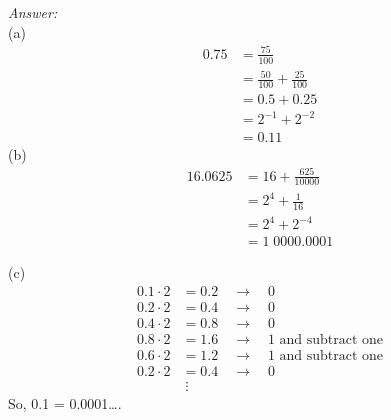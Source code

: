 \documentclass[11pt]{article}
\newcommand{\answer}{{\color{red}\textit{Answer: }}}
\begin{document}
\answer \\
(a)
\begin{align*}
    0.75 &= \frac{75}{100}\\
         &= \frac{50}{100} + \frac{25}{100}\\
         &= 0.5 + 0.25 \\
         &= 2^{-1} + 2^{-2}\\
         &= 0.11
\end{align*}
(b)
\begin{align*}
    16.0625 &= 16 + \frac{625}{10000}\\
            &= 2^4 + \frac{1}{16}\\
            &= 2^4 + 2^{-4} \\
            &= 1\;0000.0001
\end{align*}

(c)
\begin{align*}
    0.1 \cdot 2 &= 0.2 \quad\rightarrow\quad 0\\
    0.2 \cdot 2 &= 0.4 \quad\rightarrow\quad 0\\
	0.4 \cdot 2 &= 0.8 \quad\rightarrow\quad 0\\
	0.8 \cdot 2 &= 1.6 \quad\rightarrow\quad 1 \text{ and subtract one}\\
	0.6 \cdot 2 &= 1.2 \quad\rightarrow\quad 1 \text{ and subtract one}\\
	0.2 \cdot 2 &= 0.4 \quad\rightarrow\quad 0\\
    &\;\vdots
\end{align*}
So, 0.1 = 0.0001\ldots.
\end{document}
